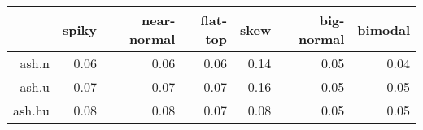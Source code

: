 \begin{tabular}{rrrrrrr}
  \toprule  & spiky & near-normal & flat-top & skew & big-normal & bimodal \\ 
  \midrule ash.n & 0.06 & 0.06 & 0.06 & 0.14 & 0.05 & 0.04 \\ 
  ash.u & 0.07 & 0.07 & 0.07 & 0.16 & 0.05 & 0.05 \\ 
  ash.hu & 0.08 & 0.08 & 0.07 & 0.08 & 0.05 & 0.05 \\ 
   \bottomrule \end{tabular}

